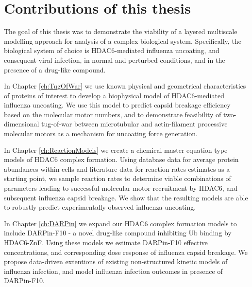 \section{Contributions of this thesis}

The goal of this thesis was to demonstrate the viability of a layered multiscale modelling approach for analysis of a complex biological system. Specifically, the biological system of choice is HDAC6-mediated influenza uncoating, and consequent viral infection, in normal and perturbed conditions, and in the presence of a drug-like compound.

In Chapter \ref{ch:TugOfWar} we use known physical and geometrical characteristics of proteins of interest to develop a biophysical model of HDAC6-mediated influenza uncoating. We use this model to predict capsid breakage efficiency based on the molecular motor numbers, and to demonstrate feasibility of two-dimensional tug-of-war between microtubular and actin-filament processive molecular motors as a mechanism for uncoating force generation.

In Chapter \ref{ch:ReactionModels} we create a chemical master equation type models of HDAC6 complex formation. Using database data for average protein abundances within cells and literature data for reaction rates estimates as a starting point, we sample reaction rates to determine viable combinations of parameters leading to successful molecular motor recruitment by HDAC6, and subsequent influenza capsid breakage. We show that the resulting models are able to robustly predict experimentally observed influenza uncoating.

In Chapter \ref{ch:DARPin} we expand our HDAC6 complex formation models to include DARPin-F10 - a novel drug-like compound inhibiting Ub binding by HDAC6-ZnF. Using these models we estimate DARPin-F10 effective concentrations, and corresponding dose response of influenza capsid breakage. We propose data-driven extentions of existing non-structured kinetic models of influenza infection, and model influenza infection outcomes in presence of DARPin-F10.